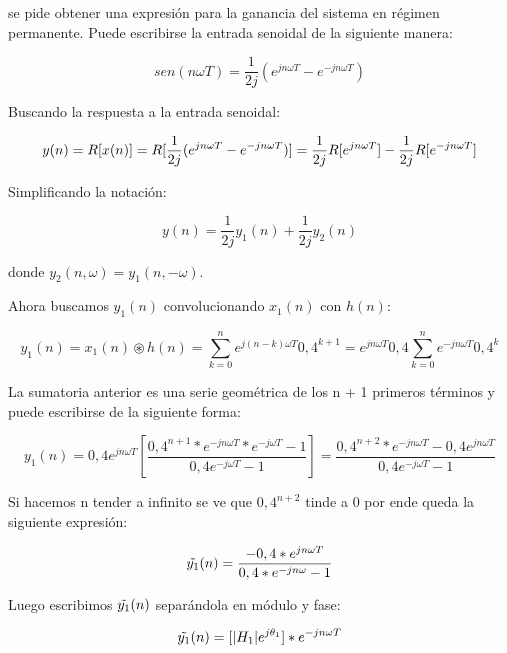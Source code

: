 se pide obtener una expresión para la ganancia del sistema en régimen permanente. 
Puede escribirse la entrada senoidal de la siguiente manera:

\begin{equation}
    sen(n\omega T) = \frac{1}{2j}(e^{jn\omega T} - e^{-jn\omega T})
\end{equation}{}

Buscando la respuesta a la entrada senoidal:

\begin{equation}
    y(n) = R[x(n)] = R[\frac{1}{2j}(e^{jn\omega T} - e^{-jn\omega T})] \\
    = \frac{1}{2j}R[e^{jn\omega T}] - \frac{1}{2j}R[e^{-jn\omega T}]
\end{equation}{}

Simplificando la notación:

\begin{equation}
    y(n) = \frac{1}{2j}y_{1}(n) + \frac{1}{2j}y_2(n)
\end{equation}{}

donde $y_2(n, \omega) = y_1(n , -\omega) $.

Ahora buscamos $y_1(n)$ convolucionando $x_1(n)$ con $h(n)$:

\begin{equation}
    y_1(n) = x_1(n)\circledast h(n) = \sum_{k=0}^{n} e^{j(n - k)\omega T}0,4^{k + 1} = e^{jn\omega T}0,4\sum_{k=0}^{n} e^{-jn\omega T}0,4^k
\end{equation}{}

La sumatoria anterior es una serie geométrica de los n + 1 primeros términos y puede escribirse de la siguiente forma:

\begin{equation}
y_1(n) = 0,4e^{jn\omega T}[\frac{0,4^{n + 1} * e^{-jn\omega T} * e^{-j\omega T} - 1}{0,4e^{-j\omega T} - 1}] = \frac{0,4^{n + 2} * e^{-jn\omega T} - 0,4e^{jn\omega T}}{0,4e^{-j\omega T} - 1}    
\end{equation}

Si hacemos n tender a infinito se ve que $0,4^{n + 2}$ tinde a 0 por ende queda la siguiente expresión:

\begin{equation}
\Tilde{y_1}(n) = \frac{-0,4*e^{jn\omega T}}{0,4*e^{-jn\omega} - 1}
\end{equation}{}

Luego escribimos $\Tilde{y_1}(n)$ separándola en módulo y fase:

\begin{equation}
\Tilde{y_1}(n) = [|H_1|e^{j\theta _1}] *e^{-jn\omega T}
\end{equation}

